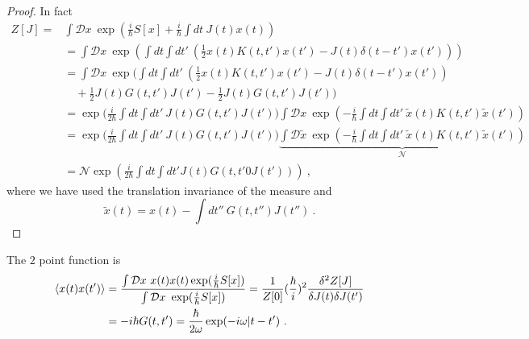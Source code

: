     \begin{proof}
        In fact 
        \begin{equation*}
        \begin{aligned}
            Z[J] = & \int \mathcal D x ~ \exp(\frac{i}{\hbar} S[x] + \frac{i}{\hbar} \int dt ~ J(t) x(t)) \\ & = \int \mathcal D x ~ \exp(\int dt \int dt' ~ (\frac{1}{2} x(t) K(t, t') x(t') - J(t) \delta(t-t') x(t'))) \\ & = \int \mathcal D x ~ \exp(\int dt \int dt' ~ (\frac{1}{2} x(t) K(t, t') x(t') - J(t) \delta(t-t') x(t')) \\ & \quad + \frac{1}{2} J(t) G(t,t') J(t') - \frac{1}{2} J(t) G(t,t') J(t')) \\ & = \exp \Big(\frac{i}{2\hbar} \int dt \int dt' ~ J(t) G(t, t') J(t') \Big) \int \mathcal D x ~ \exp(- \frac{i}{\hbar} \int dt \int dt' ~ \tilde x(t) K(t, t') \tilde x(t')) \\ & = \exp \Big(\frac{i}{2\hbar} \int dt \int dt' ~ J(t) G(t, t') J(t') \Big) \underbrace{\int \mathcal D \tilde x ~ \exp(- \frac{i}{\hbar} \int dt \int dt' ~ \tilde x(t) K(t, t') \tilde x(t'))}_{\mathcal N} \\ & = \mathcal N \exp(\frac{i}{2\hbar} \int dt \int dt' J(t) G(t, t'0 J(t'))) ~,
        \end{aligned}
        \end{equation*}
        where we have used the translation invariance of the measure and 
        \begin{equation*}
            \tilde x(t) = x(t) - \int dt'' ~ G(t, t'') J(t'') ~.
        \end{equation*}
    \end{proof}
    The $2$ point function is 
    \begin{equation*}
    \begin{aligned}
        \langle x(t) x(t')\rangle & = \frac{\int \mathcal D x ~ x(t) x(t) \exp(\frac{i}{\hbar} S[x])}{\int \mathcal D x ~ \exp(\frac{i}{\hbar} S[x])} = \frac{1}{Z[0]} (\frac{\hbar}{i})^2 \frac{\delta^2 Z[J]}{\delta J(t) \delta J(t')} \\ & = - i \hbar G(t, t') = \frac{\hbar}{2 \omega} \exp(- i \omega |t - t') ~.
    \end{aligned}
    \end{equation*}

